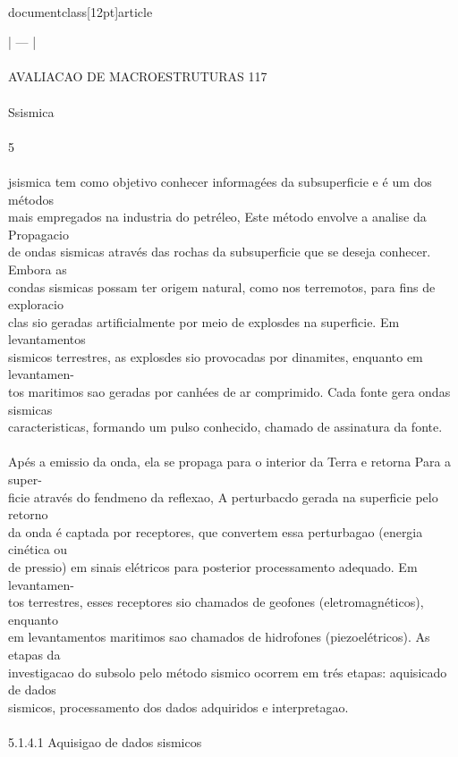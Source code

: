 \\documentclass[12pt]{article}
\begin{document}
| — |\\
\\
AVALIACAO DE MACROESTRUTURAS 117\\
\\
Ssismica\\
\\
5\\
\\
jsismica tem como objetivo conhecer informagées da subsuperficie e é um dos métodos\\
mais empregados na industria do petréleo, Este método envolve a analise da Propagacio\\
de ondas sismicas através das rochas da subsuperficie que se deseja conhecer. Embora as\\
condas sismicas possam ter origem natural, como nos terremotos, para fins de exploracio\\
clas sio geradas artificialmente por meio de explosdes na superficie. Em levantamentos\\
sismicos terrestres, as explosdes sio provocadas por dinamites, enquanto em levantamen-\\
tos maritimos sao geradas por canhées de ar comprimido. Cada fonte gera ondas sismicas\\
caracteristicas, formando um pulso conhecido, chamado de assinatura da fonte.\\
\\
Apés a emissio da onda, ela se propaga para o interior da Terra e retorna Para a super-\\
ficie através do fendmeno da reflexao, A perturbacdo gerada na superficie pelo retorno\\
da onda é captada por receptores, que convertem essa perturbagao (energia cinética ou\\
de pressio) em sinais elétricos para posterior processamento adequado. Em levantamen-\\
tos terrestres, esses receptores sio chamados de geofones (eletromagnéticos), enquanto\\
em levantamentos maritimos sao chamados de hidrofones (piezoelétricos). As etapas da\\
investigacao do subsolo pelo método sismico ocorrem em trés etapas: aquisicado de dados\\
sismicos, processamento dos dados adquiridos e interpretagao.\\
\\
5.1.4.1 Aquisigao de dados sismicos\\
\\
\end{document}
